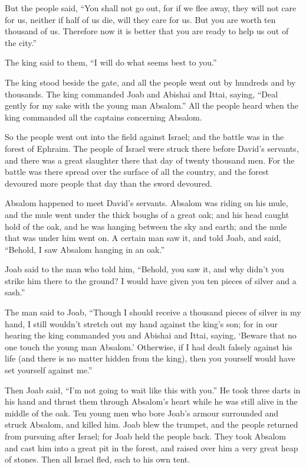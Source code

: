 But the people said, ``You shall not go out, for if we flee
away, they will not care for us, neither if half of us die, will they
care for us. But you are worth ten thousand of us. Therefore now it is
better that you are ready to help us out of the city.''

 The king said to them, ``I will do what seems best to
you.''

The king stood beside the gate, and all the people went out by hundreds
and by thousands.  The king commanded Joab and Abishai and
Ittai, saying, ``Deal gently for my sake with the young man Absalom.''
All the people heard when the king commanded all the captains concerning
Absalom.

 So the people went out into the field against Israel; and
the battle was in the forest of Ephraim.  The people of
Israel were struck there before David's servants, and there was a great
slaughter there that day of twenty thousand men.  For the
battle was there spread over the surface of all the country, and the
forest devoured more people that day than the sword devoured.

 Absalom happened to meet David's servants. Absalom was
riding on his mule, and the mule went under the thick boughs of a great
oak; and his head caught hold of the oak, and he was hanging between the
sky and earth; and the mule that was under him went on.  A
certain man saw it, and told Joab, and said, ``Behold, I saw Absalom
hanging in an oak.''

 Joab said to the man who told him, ``Behold, you saw it,
and why didn't you strike him there to the ground? I would have given
you ten pieces of silver and a sash.''

 The man said to Joab, ``Though I should receive a thousand
pieces of silver in my hand, I still wouldn't stretch out my hand
against the king's son; for in our hearing the king commanded you and
Abishai and Ittai, saying, `Beware that no one touch the young man
Absalom.'  Otherwise, if I had dealt falsely against his
life (and there is no matter hidden from the king), then you yourself
would have set yourself against me.''

 Then Joab said, ``I'm not going to wait like this with
you.'' He took three darts in his hand and thrust them through Absalom's
heart while he was still alive in the middle of the oak. 
Ten young men who bore Joab's armour surrounded and struck Absalom, and
killed him.  Joab blew the trumpet, and the people returned
from pursuing after Israel; for Joab held the people back. 
They took Absalom and cast him into a great pit in the forest, and
raised over him a very great heap of stones. Then all Israel fled, each
to his own tent.

